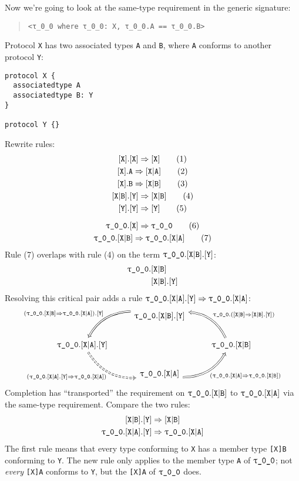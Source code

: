 \documentclass[../generics]{subfiles}
\begin{document}
\begin{example}
Now we're going to look at the same-type requirement in the generic signature:
\begin{quote}
\begin{verbatim}
<τ_0_0 where τ_0_0: X, τ_0_0.A == τ_0_0.B>
\end{verbatim}
\end{quote}
Protocol \texttt{X} has two associated types \texttt{A} and \texttt{B}, where \texttt{A} conforms to another protocol \texttt{Y}:
\begin{Verbatim}
protocol X {
  associatedtype A
  associatedtype B: Y
}

protocol Y {}
\end{Verbatim}
Rewrite rules:
\begin{gather*}
\ProtoConf{\protosym{X}}{X}\tag{1}\\
\AssocIntro{X}{A}\tag{2}\\
\AssocIntro{X}{B}\tag{3}\\
\ProtoConf{\assocsym{X}{B}}{Y}\tag{4}\\
\ProtoConf{\protosym{Y}}{Y}\tag{5}\\[\medskipamount]
\ProtoConf{\ttgp{0}{0}}{X}\tag{6}\\
\ttgp{0}{0}.\assocsym{X}{B}\Rightarrow\ttgp{0}{0}.\assocsym{X}{A}\tag{7}
\end{gather*}
Rule (7) overlaps with rule (4) on the term $\texttt{$\uptau$\_0\_0}.[\texttt{X}|\texttt{B}].[\texttt{Y}]$:
\begin{align*}
\texttt{$\uptau$\_0\_0}.&[\texttt{X}|\texttt{B}]\\
&[\texttt{X}|\texttt{B}].[\texttt{Y}]
\end{align*}
Resolving this critical pair adds a rule $\texttt{$\uptau$\_0\_0}.[\texttt{X}|\texttt{A}].[\texttt{Y}]\Rightarrow \texttt{$\uptau$\_0\_0}.[\texttt{X}|\texttt{A}]$:
\[
\FourLoopDerived%
{\ttgp{0}{0}.\assocsym{X}{B}.\protosym{Y}}%
{\ttgp{0}{0}.\assocsym{X}{A}.\protosym{Y}}%
{\ttgp{0}{0}.\assocsym{X}{A}}%
{\ttgp{0}{0}.\assocsym{X}{B}}%
{(\ttgp{0}{0}.\assocsym{X}{B}\Rightarrow\ttgp{0}{0}.\assocsym{X}{A}).\protosym{Y}}%
{(\ProtoConf{\ttgp{0}{0}.\assocsym{X}{A}}{Y})}%
{(\ttgp{0}{0}.\assocsym{X}{A}\Rightarrow\ttgp{0}{0}.\assocsym{X}{B})}%
{\ttgp{0}{0}.(\ProtoConfInv{\assocsym{X}{B}}{Y})}
\]
Completion has ``transported'' the requirement on $\texttt{$\uptau$\_0\_0}.[\texttt{X}|\texttt{B}]$ to $\texttt{$\uptau$\_0\_0}.[\texttt{X}|\texttt{A}]$ via the same-type requirement. Compare the two rules:
\begin{gather*}
[\texttt{X}|\texttt{B}].[\texttt{Y}]\Rightarrow [\texttt{X}|\texttt{B}]\\
\texttt{$\uptau$\_0\_0}.[\texttt{X}|\texttt{A}].[\texttt{Y}]\Rightarrow \texttt{$\uptau$\_0\_0}.[\texttt{X}|\texttt{A}]
\end{gather*}
The first rule means that every type conforming to \texttt{X} has a member type \texttt{[X]B} conforming to \texttt{Y}. The new rule only applies to the member type \texttt{A} of $\texttt{$\uptau$\_0\_0}$; not \emph{every} \texttt{[X]A} conforms to \texttt{Y}, but the \texttt{[X]A} of $\texttt{$\uptau$\_0\_0}$ does.
\end{example}
\end{document}
